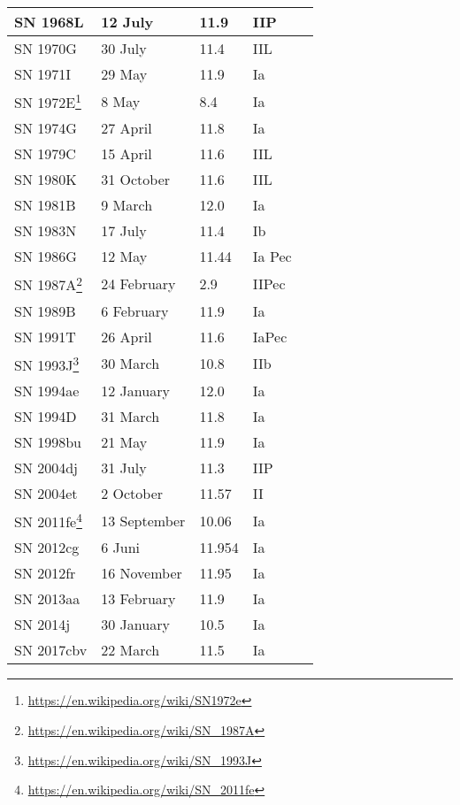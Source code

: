 \begin{longtable}{l|l|l|l|l}
SN 1968L & 12 July      & 11.9  & IIP & \\\midrule
SN 1970G & 30 July      & 11.4  & IIL & \\\midrule
SN 1971I & 29 May       & 11.9  & Ia  & \\\midrule
SN 1972E\footnote{\url{https://en.wikipedia.org/wiki/SN1972e}} & 8 May & 8.4 & Ia & \\\midrule
SN 1974G & 27 April     & 11.8  & Ia  & \\\midrule
SN 1979C & 15 April     & 11.6  & IIL & \\\midrule
SN 1980K & 31 October   & 11.6  & IIL & \\\midrule
SN 1981B &  9 March     & 12.0  & Ia  & \\\midrule
SN 1983N & 17 July      & 11.4  & Ib  & \\\midrule
SN 1986G & 12 May       & 11.44 & Ia Pec & \\\midrule
SN 1987A\footnote{\url{https://en.wikipedia.org/wiki/SN_1987A}} & 24 February & 2.9 & IIPec & \\\midrule
SN 1989B &  6 February  & 11.9  & Ia    & \\\midrule
SN 1991T & 26 April     & 11.6  & IaPec & \\\midrule
SN 1993J\footnote{\url{https://en.wikipedia.org/wiki/SN_1993J}} & 30 March & 10.8 & IIb & \\\midrule
SN 1994ae & 12 January  & 12.0    & Ia  & \\\midrule
SN 1994D  & 31 March    & 11.8    & Ia  & \\\midrule
SN 1998bu & 21 May      & 11.9    & Ia  & \\\midrule
SN 2004dj & 31 July     & 11.3    & IIP & \\\midrule
SN 2004et &  2 October  & 11.57   & II  & \\\midrule
SN 2011fe\footnote{\url{https://en.wikipedia.org/wiki/SN_2011fe}} & 13 September & 10.06 & Ia & \\\midrule
SN 2012cg  &  6 Juni     & 11.954 & Ia & \\\midrule
SN 2012fr  & 16 November & 11.95  & Ia & \\\midrule
SN 2013aa  & 13 February & 11.9   & Ia & \\\midrule
SN 2014j   & 30 January  & 10.5   & Ia & \\\midrule
SN 2017cbv & 22 March    & 11.5   & Ia & \\\bottomrule
\end{longtable}

